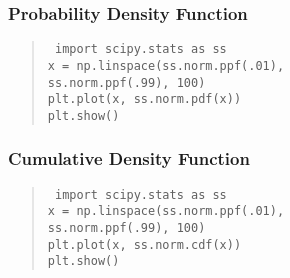 \documentclass[t]{beamer}
\begin{document}
\begin{frame}
  \frametitle{Probability Density Function}

  \vspace{1cm}
  \begin{quote}
    \tt
    import scipy.stats as ss\\
    x = np.linspace(ss.norm.ppf(.01), \\
    \hspace{1cm}ss.norm.ppf(.99), 100)\\
    plt.plot(x, ss.norm.pdf(x))\\
    plt.show()
  \end{quote}

\end{frame}

\begin{frame}
  \frametitle{Cumulative Density Function}

  \vspace{1cm}
  \begin{quote}
    \tt
    import scipy.stats as ss\\
    x = np.linspace(ss.norm.ppf(.01), \\
    \hspace{1cm}ss.norm.ppf(.99), 100)\\
    plt.plot(x, ss.norm.cdf(x))\\
    plt.show()
  \end{quote}

\end{frame}
\end{document}
